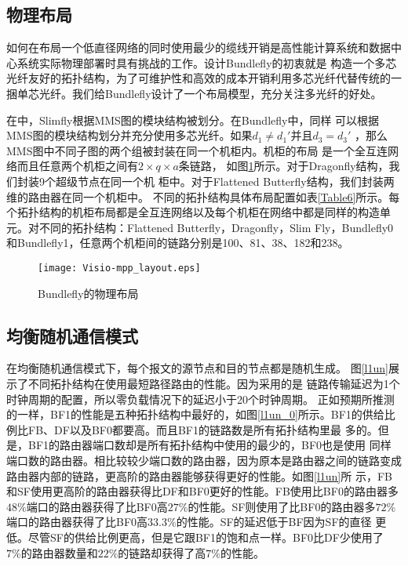 \subsection{物理布局}

如何在布局一个低直径网络的同时使用最少的缆线开销是高性能计算系统和数据中
心系统实际物理部署时具有挑战的工作。设计Bundlefly的初衷就是
构造一个多芯光纤友好的拓扑结构，为了可维护性和高效的成本开销利用多芯光纤代替传统的一捆单芯光纤。我们给Bundlefly设计了一个布局模型，充分关注多光纤的好处。

在中，Slimfly根据MMS图的模块结构被划分。在Bundlefly中，同样
可以根据MMS图的模块结构划分并充分使用多芯光纤。如果$d_1\neq d_1'$并且$d_3=d_3'$ ，那么MMS图中不同子图的两个组被封装在同一个机柜内。机柜的布局
是一个全互连网络而且任意两个机柜之间有$2\times q \times a$条链路，
如图\ref{mpplayout}所示。对于Dragonfly结构，我们封装9个超级节点在同一个机
柜中。对于Flattened Butterfly结构，我们封装两维的路由器在同一个机柜中。
不同的拓扑结构具体布局配置如表\ref{Table6}所示。每个拓扑结构的机柜布局都是全互连网络以及每个机柜在网络中都是同样的构造单元。对不同的拓扑结构：Flattened Butterfly，Dragonfly，Slim Fly，Bundlefly0和Bundlefly1，任意两个机柜间的链路分别是100、81、38、182和238。

\begin{figure}[t]
\setlength{\belowcaptionskip}{-.5cm}%
  \centering
    \texttt{[image: Visio-mpp\_layout.eps]}
  \vspace{-.3cm}
  \caption{Bundlefly的物理布局}
  \label{mpplayout}
\end{figure}

\subsection{均衡随机通信模式}

在均衡随机通信模式下，每个报文的源节点和目的节点都是随机生成。
图\ref{l1un}展示了不同拓扑结构在使用最短路径路由的性能。因为采用的是
链路传输延迟为1个时钟周期的配置，所以零负载情况下的延迟小于20个时钟周期。
正如预期所推测的一样，BF1的性能是五种拓扑结构中最好的，如图\ref{l1un_0}所示。BF1的供给比例比FB、DF以及BF0都要高。而且BF1的链路数是所有拓扑结构里最
多的。但是，BF1的路由器端口数却是所有拓扑结构中使用的最少的，BF0也是使用
同样端口数的路由器。相比较较少端口数的路由器，因为原本是路由器之间的链路变成路由器内部的链路，更高阶的路由器能够获得更好的性能。如图\ref{l1un}所
示，FB和SF使用更高阶的路由器获得比DF和BF0更好的性能。FB使用比BF0的路由器多$48\%$端口的路由器获得了比BF0高$27\%$的性能。SF则使用了比BF0的路由器多$72\%$端口的路由器获得了比BF0高$33.3\%$的性能。SF的延迟低于BF因为SF的直径
更低。尽管SF的供给比例更高，但是它跟BF1的饱和点一样。BF0比DF少使用了
$7\%$的路由器数量和$22\%$的链路却获得了高$7\%$的性能。

